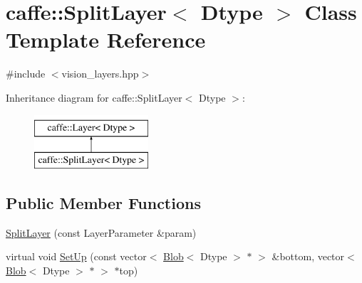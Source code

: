 \hypertarget{classcaffe_1_1_split_layer}{\section{caffe\+:\+:Split\+Layer$<$ Dtype $>$ Class Template Reference}
\label{classcaffe_1_1_split_layer}
}


{\ttfamily \#include $<$vision\+\_\+layers.\+hpp$>$}

Inheritance diagram for caffe\+:\+:Split\+Layer$<$ Dtype $>$\+:\begin{figure}[H]
\begin{center}
\leavevmode
\includegraphics[height=2.000000cm]{classcaffe_1_1_split_layer}
\end{center}
\end{figure}
\subsection*{Public Member Functions}
\begin{DoxyCompactItemize}
\item 
\hyperlink{classcaffe_1_1_split_layer_a784222a81f1921b68bf814fc9dc5d1aa}{Split\+Layer} (const Layer\+Parameter \&param)
\item 
virtual void \hyperlink{classcaffe_1_1_split_layer_ae906b539de55e5b996b471e3c3510501}{Set\+Up} (const vector$<$ \hyperlink{classcaffe_1_1_blob}{Blob}$<$ Dtype $>$ $\ast$ $>$ \&bottom, vector$<$ \hyperlink{classcaffe_1_1_blob}{Blob}$<$ Dtype $>$ $\ast$ $>$ $\ast$top)
\end{DoxyCompactItemize}
